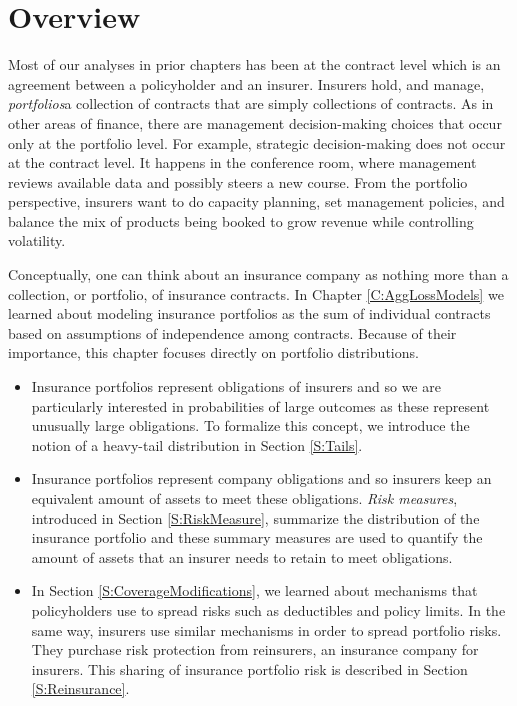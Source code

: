 \documentclass[]{book}
\theoremstyle{definition}
\theoremstyle{definition}
\theoremstyle{definition}
\theoremstyle{remark}
\begin{document}
\section*{Overview}\label{overview}

Most of our analyses in prior chapters has been at the contract level
which is an agreement between a policyholder and an insurer. Insurers
hold, and manage, \emph{portfolios}{a collection of contracts} that are
simply collections of contracts. As in other areas of finance, there are
management decision-making choices that occur only at the portfolio
level. For example, strategic decision-making does not occur at the
contract level. It happens in the conference room, where management
reviews available data and possibly steers a new course. From the
portfolio perspective, insurers want to do capacity planning, set
management policies, and balance the mix of products being booked to
grow revenue while controlling volatility.

Conceptually, one can think about an insurance company as nothing more
than a collection, or portfolio, of insurance contracts. In Chapter
\ref{C:AggLossModels} we learned about modeling insurance portfolios as
the sum of individual contracts based on assumptions of independence
among contracts. Because of their importance, this chapter focuses
directly on portfolio distributions.

\begin{itemize}
\item
  Insurance portfolios represent obligations of insurers and so we are
  particularly interested in probabilities of large outcomes as these
  represent unusually large obligations. To formalize this concept, we
  introduce the notion of a heavy-tail distribution in Section
  \ref{S:Tails}.
\item
  Insurance portfolios represent company obligations and so insurers
  keep an equivalent amount of assets to meet these obligations.
  \emph{Risk measures}, introduced in Section \ref{S:RiskMeasure},
  summarize the distribution of the insurance portfolio and these
  summary measures are used to quantify the amount of assets that an
  insurer needs to retain to meet obligations.
\item
  In Section \ref{S:CoverageModifications}, we learned about mechanisms
  that policyholders use to spread risks such as deductibles and policy
  limits. In the same way, insurers use similar mechanisms in order to
  spread portfolio risks. They purchase risk protection from reinsurers,
  an insurance company for insurers. This sharing of insurance portfolio
  risk is described in Section \ref{S:Reinsurance}.
\end{itemize}
\end{document}
